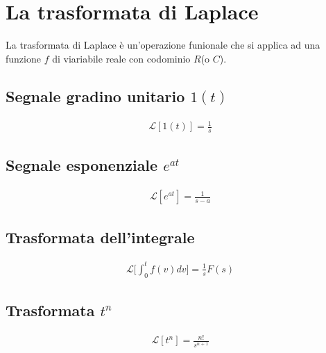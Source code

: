 \chapter{La trasformata di Laplace}


La trasformata di Laplace \`e un'operazione funionale che si applica ad una funzione $f$ di viariabile 
reale con codominio $R$(o $C$).

\section{Segnale gradino unitario $1(t)$}

\begin{align}
  \mathcal{L}[1(t)] = \frac{1}{s}
\end{align}


\section{Segnale esponenziale $e^{at}$}

\begin{align}
  \mathcal{L}[e^{at}] = \frac{1}{s - a}
\end{align}



\section{Trasformata dell'integrale}

\begin{align}
  \mathcal{L}\Bigg[\int_0^t f(v)dv\Bigg] = \frac{1}{s}F(s)
\end{align}

\section{Trasformata $t^n$}

\begin{align}
  \mathcal{L}[t^n] = \frac{n!}{s^{n+1}}
\end{align}
